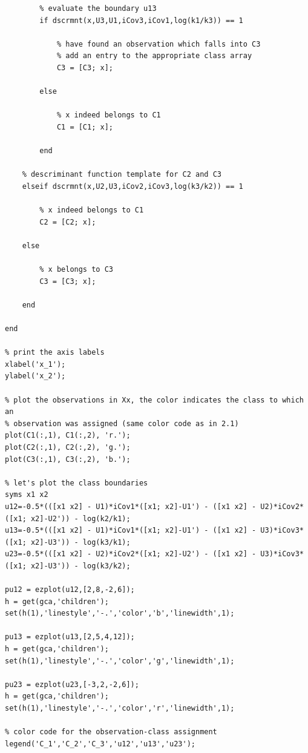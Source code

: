 \documentclass[paper=a4, fontsize=11pt]{scrartcl} %
\numberwithin{equation}{section} %
\numberwithin{figure}{section} %
\numberwithin{table}{section} %
\begin{document}
\begin{lstlisting}[label=lst:2-4-classifier-code,caption={MATLAB code for 2.4.}]
        % use the descriminant function template for C3 and C1, to 
        % evaluate the boundary u13
        if dscrmnt(x,U3,U1,iCov3,iCov1,log(k1/k3)) == 1
            
            % have found an observation which falls into C3
            % add an entry to the appropriate class array
            C3 = [C3; x];
            
        else
            
            % x indeed belongs to C1
            C1 = [C1; x];
        
        end
    
    % descriminant function template for C2 and C3
    elseif dscrmnt(x,U2,U3,iCov2,iCov3,log(k3/k2)) == 1
        
        % x indeed belongs to C1
        C2 = [C2; x];
        
    else
        
        % x belongs to C3
        C3 = [C3; x];

    end
    
end

% print the axis labels
xlabel('x_1');
ylabel('x_2');

% plot the observations in Xx, the color indicates the class to which an 
% observation was assigned (same color code as in 2.1)
plot(C1(:,1), C1(:,2), 'r.');
plot(C2(:,1), C2(:,2), 'g.');
plot(C3(:,1), C3(:,2), 'b.');

% let's plot the class boundaries
syms x1 x2
u12=-0.5*(([x1 x2] - U1)*iCov1*([x1; x2]-U1') - ([x1 x2] - U2)*iCov2*([x1; x2]-U2')) - log(k2/k1);
u13=-0.5*(([x1 x2] - U1)*iCov1*([x1; x2]-U1') - ([x1 x2] - U3)*iCov3*([x1; x2]-U3')) - log(k3/k1);
u23=-0.5*(([x1 x2] - U2)*iCov2*([x1; x2]-U2') - ([x1 x2] - U3)*iCov3*([x1; x2]-U3')) - log(k3/k2);

pu12 = ezplot(u12,[2,8,-2,6]);
h = get(gca,'children');
set(h(1),'linestyle','-.','color','b','linewidth',1);

pu13 = ezplot(u13,[2,5,4,12]);
h = get(gca,'children');
set(h(1),'linestyle','-.','color','g','linewidth',1);

pu23 = ezplot(u23,[-3,2,-2,6]);
h = get(gca,'children');
set(h(1),'linestyle','-.','color','r','linewidth',1);

% color code for the observation-class assignment
legend('C_1','C_2','C_3','u12','u13','u23');
\end{lstlisting}
\end{document}
